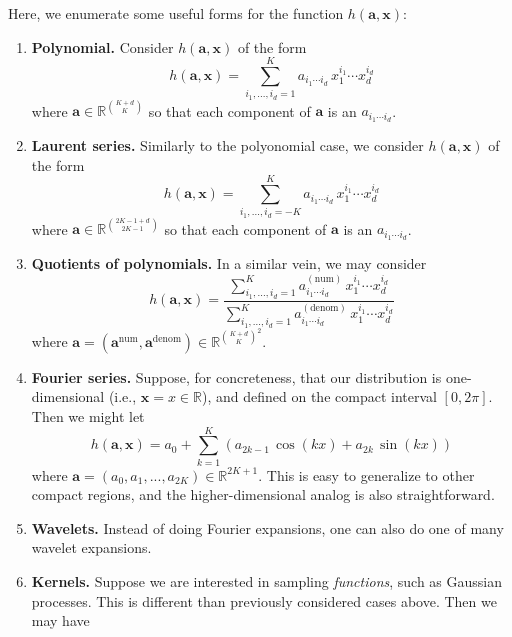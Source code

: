 \documentclass[12pt]{article}
\begin{document}
Here, we enumerate some useful forms for the function $h(\textbf{a},\textbf{x})$:
\begin{enumerate}
\item \textbf{Polynomial.}  Consider $h(\textbf{a},\textbf{x})$ of the form
\begin{equation}
h(\textbf{a},\textbf{x}) = \sum_{i_1,...,i_d = 1}^K a_{i_1 \cdots i_d} \, x_1^{i_1} \cdots x_d^{i_d}
\end{equation}
where $\textbf{a} \in \mathbb{R}^{\binom{K+d}{K}}$ so that each component of $\textbf{a}$ is an $a_{i_1 \cdots i_d}$.
\item \textbf{Laurent series.}  Similarly to the polyonomial case, we consider $h(\textbf{a},\textbf{x})$ of the form
\begin{equation}
h(\textbf{a},\textbf{x}) = \sum_{i_1,...,i_d = -K}^K a_{i_1 \cdots i_d} \, x_1^{i_1} \cdots x_d^{i_d}
\end{equation}
where $\textbf{a} \in \mathbb{R}^{\binom{2K - 1 +d}{2K - 1}}$ so that each component of $\textbf{a}$ is an $a_{i_1 \cdots i_d}$.
\item \textbf{Quotients of polynomials.} In a similar vein, we may consider
\begin{equation}
h(\textbf{a},\textbf{x}) = \frac{\sum_{i_1,...,i_d = 1}^K a_{i_1 \cdots i_d}^{(\text{num})} \, x_1^{i_1} \cdots x_d^{i_d}}{\sum_{i_1,...,i_d = 1}^K a_{i_1 \cdots i_d}^{(\text{denom})} \, x_1^{i_1} \cdots x_d^{i_d}}
\end{equation}
where $\textbf{a} = (\textbf{a}^{\text{num}}, \textbf{a}^{\text{denom}}) \in \mathbb{R}^{\binom{K + d}{K}^2}$.
\item \textbf{Fourier series.} Suppose, for concreteness, that our distribution is one-dimensional (i.e., $\textbf{x} = x \in \mathbb{R}$), and defined on the compact interval $[0,2\pi]$.  Then we might let
\begin{equation}
h(\textbf{a},\textbf{x}) = a_0 + \sum_{k=1}^K \left(a_{2k - 1} \, \cos(k x) + a_{2k} \, \sin(k x) \right)
\end{equation}
where $\textbf{a} = (a_0, a_1, ..., a_{2K}) \in \mathbb{R}^{2K+1}$.  This is easy to generalize to other compact regions, and the higher-dimensional analog is also straightforward. 
\item \textbf{Wavelets.} Instead of doing Fourier expansions, one can also do one of many wavelet expansions.
\item \textbf{Kernels.} Suppose we are interested in sampling \textit{functions}, such as Gaussian processes.  This is different than previously considered cases above.  Then we may have

\end{enumerate}
\end{document}
